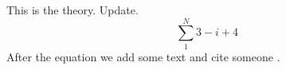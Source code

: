 This is the theory. Update.
\begin{equation}
\sum_{1}^{N}{3-i+4}
\end{equation}
After the equation we add some text and cite someone \cite{Kuchera2019}.
